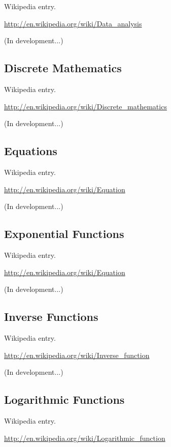 \documentclass[12pt,twoside]{book}
\begin{document}
Wikipedia entry.

\href{http://en.wikipedia.org/wiki/Data_analysis}{http://en.wikipedia.org/wiki/Data\_analysis}

(In development...)

\subsection[Discrete Mathematics]{Discrete Mathematics}

Wikipedia entry.

\href{http://en.wikipedia.org/wiki/Discrete_mathematics}{http://en.wikipedia.org/wiki/Discrete\_mathematics}

(In development...)

\subsection[Equations]{Equations}

Wikipedia entry.

\href{http://en.wikipedia.org/wiki/Equation}{http://en.wikipedia.org/wiki/Equation}

(In development...)

\subsection[Exponential Functions]{Exponential Functions}

Wikipedia entry.

\href{http://en.wikipedia.org/wiki/Equation}{http://en.wikipedia.org/wiki/Equation}

(In development...)

\subsection[Inverse Functions]{Inverse Functions}

Wikipedia entry.

\href{http://en.wikipedia.org/wiki/Inverse_function}{http://en.wikipedia.org/wiki/Inverse\_function}

(In development...)

\subsection[Logarithmic Functions]{Logarithmic Functions}

Wikipedia entry.

\href{http://en.wikipedia.org/wiki/Logarithmic_function}{http://en.wikipedia.org/wiki/Logarithmic\_function}
\end{document}
